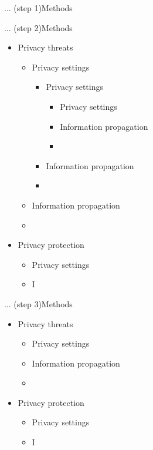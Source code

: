 \begin{frame}{... (step 1)}{Methods}
\end{frame}

\begin{frame}{... (step 2)}{Methods}
	\begin{itemize}
		\item Privacy threats
			\begin{itemize}
				\item Privacy settings
							\begin{itemize}
				\item Privacy settings
							\begin{itemize}
				\item Privacy settings
				\item Information propagation
				\item 
			\end{itemize}
				\item Information propagation
				\item 
			\end{itemize}
				\item Information propagation
				\item 
			\end{itemize}
		\item Privacy protection
			\begin{itemize}
				\item Privacy settings
				\item I
			\end{itemize}
	\end{itemize}
\end{frame}

\begin{frame}{... (step 3)}{Methods}
	\begin{itemize}
		\item Privacy threats
			\begin{itemize}
				\item Privacy settings
				\item Information propagation
				\item 
			\end{itemize}
		\item Privacy protection
			\begin{itemize}
				\item Privacy settings
				\item I
			\end{itemize}
	\end{itemize}
\end{frame}

